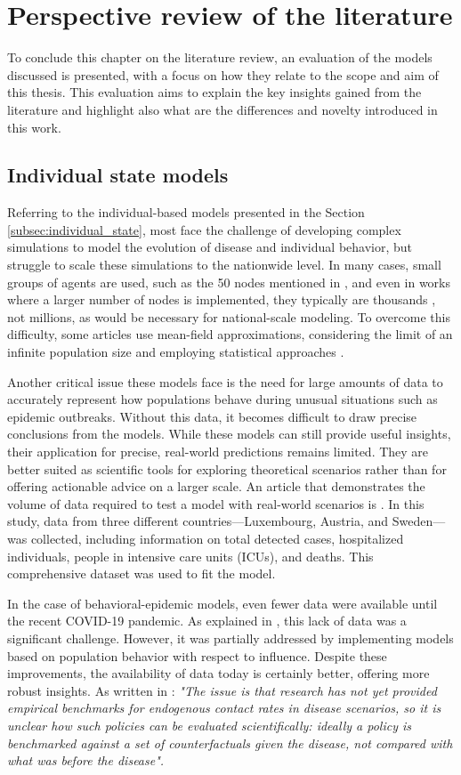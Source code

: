 \section{Perspective review of the literature}
To conclude this chapter on the literature review, an evaluation of the models discussed is presented, with a focus on how they relate to the scope and aim of this thesis. This evaluation aims to explain the key insights gained from the literature and highlight also what are the differences and novelty introduced in this work.

\subsection{Individual state models}
Referring to the individual-based models presented in the Section \ref{subsec:individual_state}, most face the challenge of developing complex simulations to model the evolution of disease and individual behavior, but struggle to scale these simulations to the nationwide level. In many cases, small groups of agents are used, such as the 50 nodes mentioned in \cite{Nunner2021}, and even in works where a larger number of nodes is implemented, they typically are thousands \cite{Granell2013}, not millions, as would be necessary for national-scale modeling. To overcome this difficulty, some articles use mean-field approximations, considering the limit of an infinite population size and employing statistical approaches \cite{Frieswijk_2022}.

Another critical issue these models face is the need for large amounts of data to accurately represent how populations behave during unusual situations such as epidemic outbreaks. Without this data, it becomes difficult to draw precise conclusions from the models. While these models can still provide useful insights, their application for precise, real-world predictions remains limited. They are better suited as scientific tools for exploring theoretical scenarios rather than for offering actionable advice on a larger scale. An article that demonstrates the volume of data required to test a model with real-world scenarios is \cite{Kemp_2021}. In this study, data from three different countries—Luxembourg, Austria, and Sweden—was collected, including information on total detected cases, hospitalized individuals, people in intensive care units (ICUs), and deaths. This comprehensive dataset was used to fit the model.

In the case of behavioral-epidemic models, even fewer data were available until the recent COVID-19 pandemic. As explained in \cite{Gosak2021}, this lack of data was a significant challenge. However, it was partially addressed by implementing models based on population behavior with respect to influence. Despite these improvements, the availability of data today is certainly better, offering more robust insights. As written in \cite{Gosak2021} : \textit{"The issue is that research has not yet provided empirical benchmarks for endogenous contact rates in disease scenarios, so it is unclear how such policies can be evaluated scientifically: ideally a policy is benchmarked against a set of counterfactuals given the disease, not compared with what was before the disease".}

